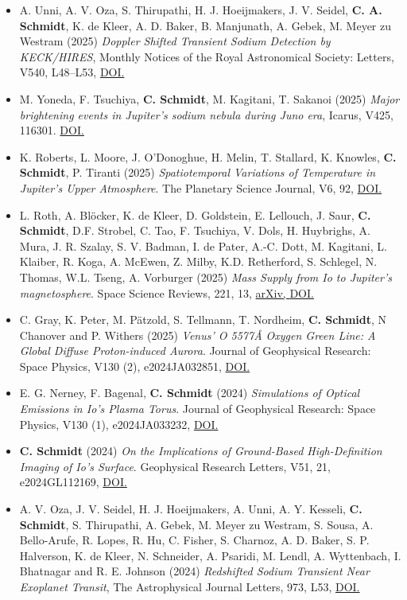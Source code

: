 \documentclass[12pt]{report}
\begin{document}
\begin{itemize}
  \item A. Unni, A. V. Oza, S. Thirupathi, H. J. Hoeijmakers, J. V. Seidel, \textbf{C. A. Schmidt}, K. de Kleer, A. D. Baker, B. Manjunath, A. Gebek, M. Meyer zu Westram (2025) \textit{Doppler Shifted Transient Sodium Detection by KECK/HIRES}, Monthly Notices of the Royal Astronomical Society: Letters, V540, L48–L53, \href{https://doi.org/10.1093/mnrasl/slaf031}{DOI.}
  \item M. Yoneda, F. Tsuchiya, \textbf{C. Schmidt}, M. Kagitani, T. Sakanoi (2025) \textit{Major brightening events in Jupiter’s sodium nebula during Juno era}, Icarus, V425, 116301. \href{https://doi.org/10.1016/j.icarus.2024.116301}{DOI.}  
  \item K. Roberts, L. Moore, J. O'Donoghue, H. Melin, T. Stallard, K. Knowles, \textbf{C. Schmidt}, P. Tiranti (2025) \textit{Spatiotemporal Variations of Temperature in Jupiter's Upper Atmosphere}. The Planetary Science Journal, V6, 92, \href{https://doi.org/10.3847/PSJ/adc09b}{DOI.}
  \item L. Roth, A. Bl\"ocker, K. de Kleer, D. Goldstein, E. Lellouch, J. Saur, \textbf{C. Schmidt}, D.F. Strobel, C. Tao, F. Tsuchiya, V. Dols, H. Huybrighs, A. Mura, J. R. Szalay, S. V. Badman, I. de Pater, A.-C. Dott, M. Kagitani, L. Klaiber, R. Koga, A. McEwen, Z. Milby, K.D. Retherford, S. Schlegel, N. Thomas, W.L. Tseng, A. Vorburger (2025) \textit{Mass Supply from Io to Jupiter's magnetosphere}. Space Science Reviews, 221, 13, \href{https://doi.org/10.48550/arXiv.2403.13970}{arXiv, }\href{https://doi.org/10.1007/s11214-025-01137-x}{DOI.}
  \item C. Gray, K. Peter, M. P\"atzold, S. Tellmann, T. Nordheim, \textbf{C. Schmidt}, N Chanover and P. Withers (2025) \textit{Venus' O 5577{\AA} Oxygen Green Line: A Global Diffuse Proton-induced Aurora}. Journal of Geophysical Research: Space Physics, V130 (2), e2024JA032851, \href{https://doi.org/10.1029/2024JA032851}{DOI.}   
  \item E. G. Nerney, F. Bagenal, \textbf{C. Schmidt} (2024) \textit{Simulations of Optical Emissions in Io's Plasma Torus}. Journal of Geophysical Research: Space Physics, V130 (1), e2024JA033232, \href{https://doi.org/10.1029/2024JA033232}{DOI.}   
  \item \textbf{C. Schmidt} (2024) \textit{On the Implications of Ground-Based High-Definition Imaging of Io's Surface}. Geophysical Research Letters, V51, 21, e2024GL112169, \href{https://doi.org/10.1029/2024GL112169}{DOI.}   
  \item A. V. Oza, J. V. Seidel, H. J. Hoeijmakers, A. Unni, A. Y. Kesseli, \textbf{C. Schmidt}, S. Thirupathi, A. Gebek, M. Meyer zu Westram, S. Sousa, A. Bello-Arufe, R. Lopes, R. Hu, C. Fisher, S. Charnoz, A. D. Baker, S. P. Halverson, K. de Kleer, N. Schneider, A. Psaridi, M. Lendl, A. Wyttenbach, I. Bhatnagar and R. E. Johnson (2024) \textit{Redshifted Sodium Transient Near Exoplanet Transit}, The Astrophysical Journal Letters, 973, L53, \href{https://doi.org/10.3847/2041-8213/ad6b29}{DOI.} 

\end{itemize}
\end{document}
